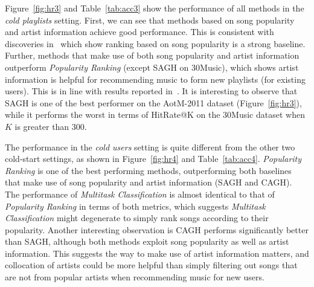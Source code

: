 Figure~\ref{fig:hr3} and Table~\ref{tab:acc3} show the performance of all methods in the \emph{cold playlists} setting.
First, we can see that methods based on song popularity and artist information achieve good performance.
This is consistent with discoveries in~\cite{bonnin2013evaluating,jannach2015beyond,bonnin2015automated} which 
show ranking based on song popularity is a strong baseline.
Further, methods that make use of both song popularity and artist information
outperform {\it Popularity Ranking} (except SAGH on 30Music), which shows artist information is helpful for 
recommending music to form new playlists (for existing users).
This is in line with results reported in~\cite{bonnin2013evaluating,bonnin2015automated}.
%
It is interesting to observe that SAGH is one of the best performer on the AotM-2011 dataset (Figure~\ref{fig:hr3}), 
while it performs the worst in terms of HitRate@K on the 30Music dataset when $K$ is greater than 300.
%


The performance in the \emph{cold users} setting %
is quite different from the other two cold-start settings, as shown in Figure~\ref{fig:hr4} and Table~\ref{tab:acc4}.
{\it Popularity Ranking} is one of the best performing methods,
outperforming both baselines that make use of song popularity and artist information (\ie SAGH and CAGH).
The performance of {\it Multitask Classification} is almost identical to that of {\it Popularity Ranking} in terms of both metrics,
which suggests {\it Multitask Classification} might degenerate to simply rank songs according to their popularity.
Another interesting observation is CAGH performs significantly better than SAGH,
although both methods exploit song popularity as well as artist information.
This suggests the way to make use of artist information matters,
and collocation of artists could be more helpful than simply filtering out songs that are not from popular artists
when recommending music for new users.


